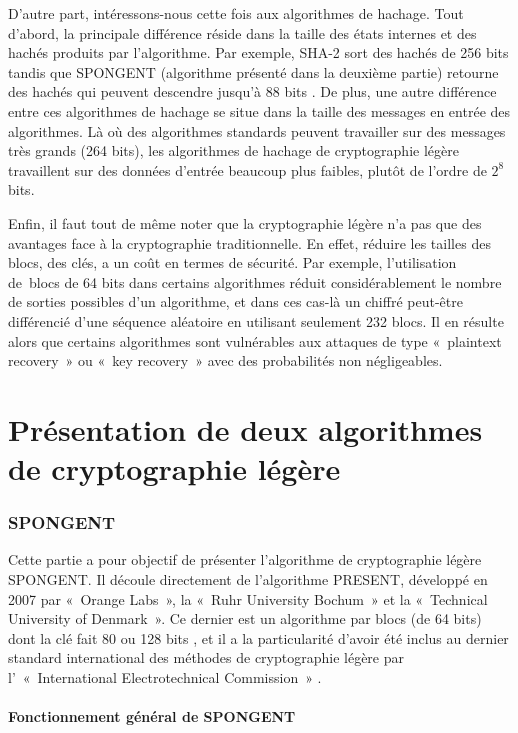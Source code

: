 	D’autre part, intéressons-nous cette fois aux algorithmes de hachage.
	Tout d’abord, la principale différence réside dans la taille des états internes et des hachés produits par l’algorithme.
	Par exemple, SHA-2 sort des hachés de 256 bits tandis que SPONGENT (algorithme présenté dans la deuxième partie) retourne des hachés qui peuvent descendre jusqu’à 88 bits \cite{6275435}.
	De plus, une autre différence entre ces algorithmes de hachage se situe dans la taille des messages en entrée des algorithmes.
	Là où des algorithmes standards peuvent travailler sur des messages très grands (264 bits), les algorithmes de hachage de cryptographie légère travaillent sur des données d’entrée beaucoup plus faibles, plutôt de l’ordre de $2^8$ bits.

	Enfin, il faut tout de même noter que la cryptographie légère n’a pas que des avantages face à la cryptographie traditionnelle.
	En effet, réduire les tailles des blocs, des clés, a un coût en termes de sécurité.
	Par exemple, l’utilisation de blocs de 64 bits dans certains algorithmes réduit considérablement le nombre de sorties possibles d’un algorithme,
	et dans ces cas-là un chiffré peut-être différencié d’une séquence aléatoire en utilisant seulement 232 blocs.
	Il en résulte alors que certains algorithmes sont vulnérables aux attaques de type « plaintext recovery » ou « key recovery » avec des probabilités non négligeables.


\part{Présentation de deux algorithmes de cryptographie légère}

	\section{SPONGENT}

	Cette partie a pour objectif de présenter l’algorithme de cryptographie légère SPONGENT.
	Il découle directement de l’algorithme PRESENT, développé en 2007 par « Orange Labs », la « Ruhr University Bochum » et la « Technical  University of Denmark ».
	Ce dernier est un algorithme par blocs (de 64 bits) dont la clé fait 80 ou 128 bits \cite{PRESENT},
	et il a la particularité d’avoir été inclus au dernier standard international des méthodes de cryptographie légère par l’ « International Electrotechnical Commission » \cite{ultraLightURL}.


		\subsection{Fonctionnement général de SPONGENT}

